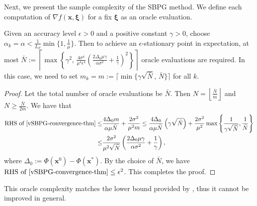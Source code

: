 \documentclass[twoside,11pt]{article}
\newcommand{\floor}[1]{\left\lfloor#1\right\rfloor}
\newcommand{\ceil}[1]{\left\lceil#1\right\rceil}
\def\vx{{\bm{x}}}
\begin{document}
{Next, we present the sample complexity of the SBPG method. We define each computation of $\nabla f(\vx,\bm\xi)$ for a fix $\bm\xi$ as an oracle evaluation.
\begin{corollary}
\label{cor:complexity-SBPG}
Given an accuracy level $\epsilon>0$ and a positive constant $\gamma > 0$, choose $\alpha_k=\alpha<\frac{1}{L_F}\min\{1,\frac{1}{\mu}\}$. Then to achieve an $\epsilon$-stationary point in expectation, at most $\bar N:=\ceil{\max\left\{\gamma^2,\,\frac{4\sigma^4}{\mu^4\epsilon^4}\left(\frac{2\Delta_0\mu\gamma}{\alpha\sigma^2}+\frac{1}{\gamma}\right)^2\right\}}$ oracle evaluations are required. 
In this case, we need to set $m_k = m := \lceil\min\{\gamma\sqrt{\bar N},\, \bar{N} \}\rceil$ for all $k.$
\end{corollary}
\begin{proof}
Let the total number of oracle evaluations be $\bar N$. 
Then $N=\floor{\frac{\bar N}{m}}$ and $N\geq\frac{\bar N}{2m}$.  We have that
\[
\begin{aligned}
 \text{RHS of }\eqref{vSBPG-convergence-thm}  \leq &\frac{4\Delta_0m}{\alpha\mu\bar N}+\frac{2\sigma^2}{\mu^2m}
 \leq \frac{4\Delta_0}{\alpha\mu\bar N}\left(\gamma\sqrt{\bar N}\right)+\frac{2\sigma^2}{\mu^2}\max\left\{\frac{1}{\gamma\sqrt{\bar N}},\frac{1}{\bar N}\right\}
 \\
 \leq&
 \frac{2\sigma^2}{\mu^2\sqrt{\bar N}}\left(\frac{2\Delta_0\mu\gamma}{\alpha\sigma^2}+\frac{1}{\gamma}\right),
\end{aligned}
\]
where $\Delta_0:=\Phi(\vx^0)-\Phi(\vx^*)$. By the choice of $\bar N$, we have $\text{RHS of }\eqref{vSBPG-convergence-thm}\leq\epsilon^2$. This completes the proof.
\end{proof} 
This oracle complexity matches the lower bound provided by \citep{arjevani2023lower}, thus it cannot be improved in general.}
\end{document}

